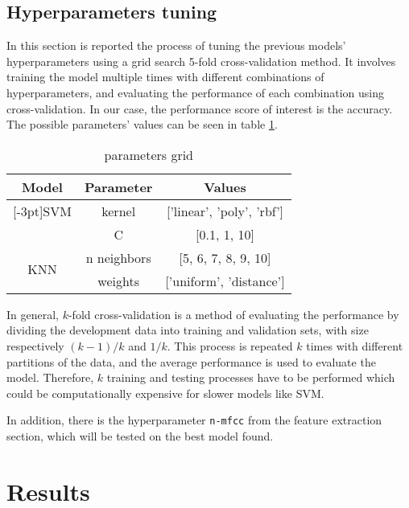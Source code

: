 \documentclass[conference]{IEEEtran}
\begin{document}
\subsection{Hyperparameters tuning}
In this section is reported the process of tuning the previous models' hyperparameters using a grid search 5-fold cross-validation method.
It involves training the model multiple times with different combinations of hyperparameters, and evaluating the performance of each combination using cross-validation.
In our case, the performance score of interest is the accuracy.
The possible parameters' values can be seen in table \ref{tab:grid}.

\begin{table}
    \centering
    \caption{parameters grid}
    \begin{tabular}{ccc}
        \toprule
        \toprule
        Model & Parameter & Values\\
        \midrule
        \addlinespace[5pt]
        \multirow{2}{*}[-3pt]{SVM}  & kernel & ['linear', 'poly', 'rbf']\\
                                    \cmidrule{2-3}
                                    & C      & [0.1, 1, 10]\\
        \midrule
        \multirow{2}{*}[-3pt]{KNN}  & n neighbors & [5, 6, 7, 8, 9, 10]\\
                                    \cmidrule{2-3}
                                    & weights     & ['uniform', 'distance']\\
        \bottomrule
    \end{tabular}
    \label{tab:grid}
\end{table}

In general, $k$-fold cross-validation is a method of evaluating the performance by dividing the development data into training and validation sets, with size respectively $(k-1)/k$ and $1/k$.
This process is repeated $k$ times with different partitions of the data, and the average performance is used to evaluate the model.
Therefore, $k$ training and testing processes have to be performed which could be computationally expensive for slower models like SVM.

In addition, there is the hyperparameter \texttt{n-mfcc} from the feature extraction section, which will be tested on the best model found.

\section{Results}
\end{document}
